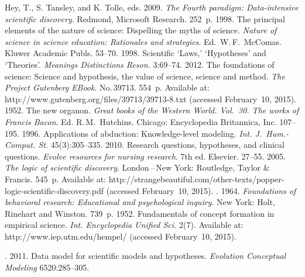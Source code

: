 \begin{multicols}{2}
\renewcommand{\bibname}{\protect\rmfamily References}

\vspace*{-6pt}

{\small\frenchspacing
{%
\begin{thebibliography}{99}



Hey, T., S. Tansley, and K. Tolle, eds. 2009. \textit{The Fourth paradigm:
Data-intensive scientific discovery}. Redmond, Microsoft Research. 252~p.
 1998. The principal elements of the nature of science:
Dispelling the myths of science. \textit{Nature of science in science education:
Rationales and strategies}. Ed.\ W.\,F.~McComas.
Kluwer Academic Publs. 53--70.
 1998. Scientific `Laws,' `Hypotheses' and `Theories'.
\textit{Meanings Distinctions Reson.} 3:69--74.
 2012. The foundations of science: Science and
hypothesis, the value of science, science and method. \textit{The Project
Gutenberg EBook}.  No.\,39713. 554~p. Available at:
{\sf http://www.gutenberg.org/files/39713/39713-8.txt}
(accessed February~10, 2015).
1952. {The new organon}. \textit{Great
books of the Western World. Vol.~30. The works of Francis Bacon}.
Ed. R.\,M.~Hutchins. Chicago: Encyclopedia
Britannica, Inc. 107--195.
 1996. Applications of abduction: Knowledge-level modeling.
\textit{Int. J.~Hum.-Comput. St.} 45(3):305--335.
 2010. Research questions, hypotheses, and clinical questions.
\textit{Evolve resources for nursing research}. 7th ed. Elsevier. 27--55.
 2005. \textit{The logic of scientific discovery}.
  London\,--\,New York: Routledge,  Taylor \& Francis. 545~p.
  Available at: {\sf http://strangebeautiful.com/other-texts/popper-logic-scientific-discovery.pdf}
  (accessed February~10, 2015).
. 1964. \textit{Foundations of behavioral
research: Educational and psychological inquiry}. New York: Holt, Rinehart and
Winston. 739~p.
 1952. Fundamentals of concept formation in empirical science.
\textit{Int. Encyclopedia Unified Sci.} 2(7). Available at: {\sf
http://www.iep.utm.edu/hempel/} (accessed February~10, 2015).

. 2011. Data model for scientific models and
hypotheses. \textit{Evolution Conceptual Modeling} 6520:285--305.


\end{thebibliography}}}
\end{multicols}
